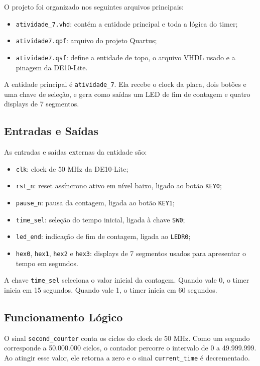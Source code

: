 \documentclass[12pt,a4paper, brazil]{article}
\begin{document}
O projeto foi organizado nos seguintes arquivos principais:

\begin{itemize}
    \item \texttt{atividade\_7.vhd}: contém a entidade principal e toda a lógica do timer;
    \item \texttt{atividade7.qpf}: arquivo do projeto Quartus;
    \item \texttt{atividade7.qsf}: define a entidade de topo, o arquivo VHDL usado e a pinagem da DE10-Lite.
\end{itemize}

A entidade principal é \texttt{atividade\_7}. Ela recebe o clock da placa, dois botões e uma chave de seleção, e gera como saídas um LED de fim de contagem e quatro displays de 7 segmentos.

\subsection{Entradas e Saídas}

As entradas e saídas externas da entidade são:

\begin{itemize}
    \item \texttt{clk}: clock de 50 MHz da DE10-Lite;
    \item \texttt{rst\_n}: reset assíncrono ativo em nível baixo, ligado ao botão \texttt{KEY0};
    \item \texttt{pause\_n}: pausa da contagem, ligada ao botão \texttt{KEY1};
    \item \texttt{time\_sel}: seleção do tempo inicial, ligada à chave \texttt{SW0};
    \item \texttt{led\_end}: indicação de fim de contagem, ligada ao \texttt{LEDR0};
    \item \texttt{hex0}, \texttt{hex1}, \texttt{hex2} e \texttt{hex3}: displays de 7 segmentos usados para apresentar o tempo em segundos.
\end{itemize}

A chave \texttt{time\_sel} seleciona o valor inicial da contagem. Quando vale 0, o timer inicia em 15 segundos. Quando vale 1, o timer inicia em 60 segundos.

\subsection{Funcionamento Lógico}

O sinal \texttt{second\_counter} conta os ciclos do clock de 50 MHz. Como um segundo corresponde a 50.000.000 ciclos, o contador percorre o intervalo de 0 a 49.999.999. Ao atingir esse valor, ele retorna a zero e o sinal \texttt{current\_time} é decrementado.
\end{document}
